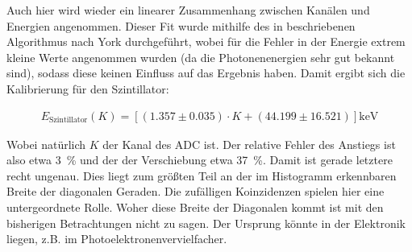 Auch hier wird wieder ein linearer Zusammenhang zwischen Kanälen und Energien angenommen. Dieser Fit wurde mithilfe des in \cite{Fit_bivariate} beschriebenen Algorithmus nach York durchgeführt, wobei für die Fehler in der Energie extrem kleine Werte angenommen wurden (da die Photonenenergien sehr gut bekannt sind), sodass diese keinen Einfluss auf das Ergebnis haben.
Damit ergibt sich die Kalibrierung für den Szintillator:

\begin{gather}
    E_{\text{Szintillator}} (K) = [(1.357 \pm 0.035) \cdot K + (44.199 \pm 16.521)] \si{\kilo\electronvolt}
\end{gather}

Wobei natürlich $K$ der Kanal des ADC ist.
Der relative Fehler des Anstiegs ist also etwa \SI{3}{\percent} und der der Verschiebung etwa \SI{37}{\percent}. Damit ist gerade letztere recht ungenau. Dies liegt zum größten Teil an der im Histogramm erkennbaren Breite der diagonalen Geraden. Die zufälligen Koinzidenzen spielen hier eine untergeordnete Rolle. Woher diese Breite der Diagonalen kommt ist mit den bisherigen Betrachtungen nicht zu sagen. Der Ursprung könnte in der Elektronik liegen, z.B. im Photoelektronenvervielfacher.
